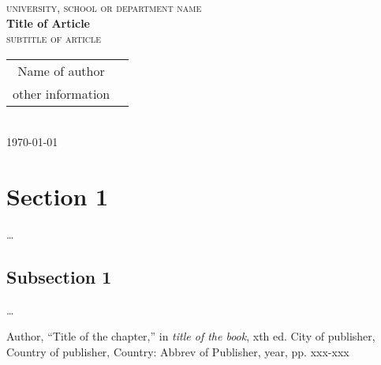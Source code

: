 \documentclass[10pt, a4paper, oneside]{article}
\begin{document}
\thispagestyle{empty}
\begin{center}
  \textsc{university, school or department name} \\ [60pt] 

  \textbf{{\LARGE Title of Article}} \\ [1pt]
  \textsc{{\large subtitle of article }} \\ [20pt]

  \begin{tabular}{cc}
    Name of author  \\
    other information
  \end{tabular} \\ [20pt]
  \today \\
\end{center}

\tableofcontents

\begin{abstract}
\ldots
\end{abstract}

\newpage

\section{Section 1}
\ldots
\subsection{Subsection 1}
\ldots
      
\begin{thebibliography}{9}

  Author,
  ``Title of the chapter,'' in 
  \emph{title of the book},
  xth ed.
  City of publisher,
  Country of publisher,
  Country:
  Abbrev of Publisher,
  year,
  pp. xxx-xxx

\end{thebibliography}      
      
\end{document}
